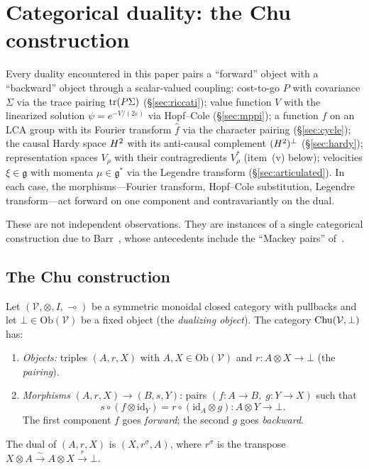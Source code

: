 \section{Categorical duality: the Chu construction}\label{sec:chu}

Every duality encountered in this paper pairs a ``forward'' object with
a ``backward'' object through a scalar-valued coupling:
cost-to-go $P$ with covariance $\Sigma$ via the trace pairing $\operatorname{tr}(P\Sigma)$
(\S\ref{sec:riccati});
value function $V$ with the linearized solution
$\psi = e^{-V/(2\varepsilon)}$ via Hopf--Cole (\S\ref{sec:mppi});
a function $f$ on an LCA group with its Fourier transform $\hat{f}$
via the character pairing (\S\ref{sec:cycle});
the causal Hardy space $H^2$ with its anti-causal complement
$(H^2)^\perp$ (\S\ref{sec:hardy});
representation spaces $V_\rho$ with their contragredients $V_\rho^*$
(item~(v) below);
velocities $\xi \in \mathfrak{g}$ with momenta $\mu \in \mathfrak{g}^*$
via the Legendre transform (\S\ref{sec:articulated}).
In each case, the morphisms---Fourier transform, Hopf--Cole substitution,
Legendre transform---act forward on one component and contravariantly on
the dual.

These are not independent observations.
They are instances of a single categorical construction due to
Barr~\cite{Barr1979,BarrOmatt}, whose antecedents include the
``Mackey pairs'' of~\cite{Mackey1945}.

\subsection*{The Chu construction}

\begin{definition}
\label{def:chu-space}
Let $(\mathcal{V}, \otimes, I, \multimap)$ be a symmetric monoidal
closed category with pullbacks and let
$\bot \in \mathrm{Ob}(\mathcal{V})$ be a fixed object (the
\emph{dualizing object}).
The category $\mathrm{Chu}(\mathcal{V}, \bot)$ has:
\begin{enumerate}[label=(\roman*),nosep]
\item \emph{Objects:} triples $(A, r, X)$ with
  $A, X \in \mathrm{Ob}(\mathcal{V})$ and
  $r \colon A \otimes X \to \bot$ (the \emph{pairing}).
\item \emph{Morphisms} $(A, r, X) \to (B, s, Y)$: pairs
  $(f \colon A \to B,\; g \colon Y \to X)$ such that
  \[
    s \circ (f \otimes \mathrm{id}_Y)
    = r \circ (\mathrm{id}_A \otimes g)
    \colon A \otimes Y \to \bot.
  \]
  The first component $f$ goes \emph{forward}; the second $g$ goes
  \emph{backward}.
\end{enumerate}
The dual of $(A, r, X)$ is $(X, r^\sigma, A)$, where $r^\sigma$ is
the transpose $X \otimes A \xrightarrow{\sim} A \otimes X
\xrightarrow{r} \bot$.
\end{definition}


